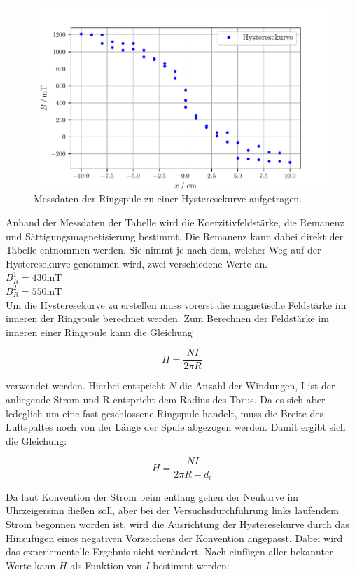 \begin{figure}
  \centering
  \includegraphics[width=\textwidth]{build/Hysteresekurve.pdf}
  \caption{Messdaten der Ringspule zu einer Hysteresekurve aufgetragen.}\label{fig:hysterese}
\end{figure}

Anhand der Messdaten der Tabelle wird die Koerzitivfeldstärke, die Remanenz
und Sättigungsmagnetisierung bestimmt.
Die Remanenz kann dabei direkt der Tabelle entnommen werden. Sie nimmt je nach dem, welcher Weg 
auf der Hysteresekurve genommen wird, zwei verschiedene Werte an.\\

$B_{R}^1=430 \si{\milli\tesla}$\\
$B_{R}^2=550 \si{\milli\tesla}$\\

Um die Hysteresekurve zu erstellen muss vorerst die magnetische Feldstärke im inneren der Ringspule berechnet werden.
Zum Berechnen der Feldstärke im inneren einer Ringspule kann die Gleichung 

\begin{equation}
H=\frac{NI}{2\pi R}
\end{equation}

verwendet werden. Hierbei entspricht $N$ die Anzahl der Windungen, I ist der anliegende Strom und 
R entspricht dem Radius des Torus. Da es sich aber ledeglich um eine fast geschlossene Ringspule handelt, muss die Breite des Luftspaltes
noch von der Länge der Spule abgezogen werden. Damit ergibt sich die Gleichung:

\begin{equation}
H=\frac{NI}{2\pi R-d_l}
\end{equation}

Da laut Konvention der Strom beim entlang gehen der Neukurve im Uhrzeigersinn fließen soll, aber 
bei der Versuchsdurchführung links laufendem Strom begonnen worden ist, wird die Ausrichtung der Hysteresekurve
durch das Hinzufügen eines negativen Vorzeichens der Konvention angepasst. Dabei wird das experiementelle
Ergebnis nicht verändert.
Nach einfügen aller bekannter Werte kann $H$ als Funktion von $I$ bestimmt werden:

